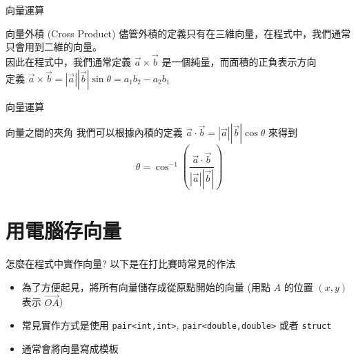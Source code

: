 \documentclass[aspectratio=169]{beamer}
\begin{document}
\begin{frame}{向量運算}
    \begin{alertblock}{向量外積 (Cross Product)}
        儘管外積的定義只有在三維向量，在程式中，我們通常只會用到二維的向量。 \\
        \vspace{2.5mm}
        因此在程式中，我們通常定義 $\vec a \times \vec b$ 是一個純量，而面積的正負表示方向 \\
        \vspace{2.5mm}
        定義 $\vec a \times \vec b = |\vec a| |\vec b| \sin \theta = a_1b_2 - a_2b_1$
    \end{alertblock}
    \begin{figure}
    \hspace{5mm}
    \end{figure}
\end{frame}

\begin{frame}{向量運算}
    \begin{alertblock}{向量之間的夾角}
        我們可以根據內積的定義 $\vec a \cdot \vec b = |\overrightarrow{a}| |\overrightarrow{b}| \cos \theta$ 來得到
        $$\theta = \cos^{-1}(\frac{\vec a \cdot \vec b}{|\overrightarrow{a}| |\overrightarrow{b}|})$$
    \end{alertblock}
\end{frame}

\section{用電腦存向量}

\begin{frame}{怎麼在程式中實作向量?}
    以下是在打比賽時常見的作法
    \begin{itemize}
        \item 為了方便起見，將所有向量儲存成從原點開始的向量 (用點 $A$ 的位置 $(x,y)$ 表示 $\overrightarrow{OA}$)
        \item 常見實作方式是使用 \texttt{pair<int,int>}, \texttt{pair<double,double>} 或者 \texttt{struct}
        \item 通常會將向量寫成模板
    \end{itemize}
\end{frame}
\end{document}
